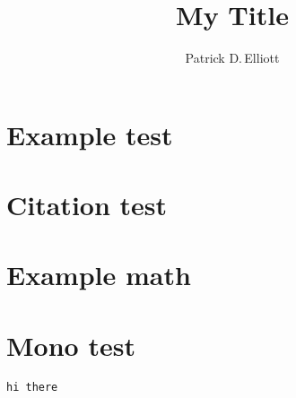 \documentclass{scrartcl}
\title{My Title}
\author{Patrick D.\,Elliott}
\begin{document}
\maketitle

\section{Example test}

\section{Citation test}

\section{Example math}

\section{Mono test}

\texttt{hi there}

\printbibliography
\end{document}
